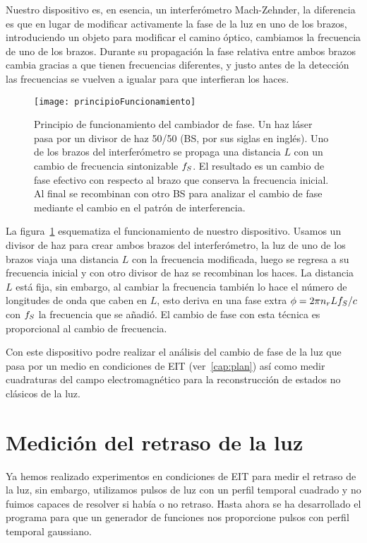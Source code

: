 \p Nuestro dispositivo es, en esencia, un interferómetro Mach-Zehnder, la diferencia es que en lugar de modificar activamente la fase de la luz en uno de los brazos, introduciendo un objeto para modificar el camino óptico, cambiamos la frecuencia de uno de los brazos. Durante su propagación la fase relativa entre ambos brazos cambia gracias a que tienen frecuencias diferentes, y justo antes de la detección las frecuencias se vuelven a igualar para que interfieran los haces.

\begin{figure}
\centering
\begin{minipage}{0.8\textwidth}
\centering
\texttt{[image: principioFuncionamiento]}
\caption{\label{fig:principioFuncionamiento}Principio de funcionamiento del cambiador de fase. Un haz láser pasa por un divisor de haz 50/50 (BS, por sus siglas en inglés). Uno de los brazos del interferómetro se propaga una distancia $L$ con un cambio de frecuencia sintonizable $f_{S}$. El resultado es un cambio de fase efectivo con respecto al brazo que conserva la frecuencia inicial. Al final se recombinan con otro BS para analizar el cambio de fase mediante el cambio en el patrón de interferencia.}
\end{minipage}
\end{figure}

\p La figura~\ref{fig:principioFuncionamiento} esquematiza el funcionamiento de nuestro dispositivo. Usamos un divisor de haz para crear ambos brazos del interferómetro, la luz de uno de los brazos viaja una distancia $L$ con la frecuencia modificada, luego se regresa a su frecuencia inicial y con otro divisor de haz se recombinan los haces. La distancia $L$ está fija, sin embargo, al cambiar la frecuencia también lo hace el número de longitudes de onda que caben en $L$, esto deriva en una fase extra $\phi=2\pi n_{r}Lf_{S}/c$ con $f_{S}$ la frecuencia que se añadió. El cambio de fase con esta técnica es proporcional al cambio de frecuencia.

\p Con este dispositivo podre realizar el análisis del cambio de fase de la luz que pasa por un medio en condiciones de EIT (ver~\ref{cap:plan}) así como medir cuadraturas del campo electromagnético para la reconstrucción de estados no clásicos de la luz.

\section{\label{sec:retrasoLuz}Medición del retraso de la luz}

Ya hemos realizado experimentos en condiciones de EIT para medir el retraso de la luz, sin embargo, utilizamos pulsos de luz con un perfil temporal cuadrado y no fuimos capaces de resolver si había o no retraso. Hasta ahora se ha desarrollado el programa para que un generador de funciones nos proporcione pulsos con perfil temporal gaussiano.